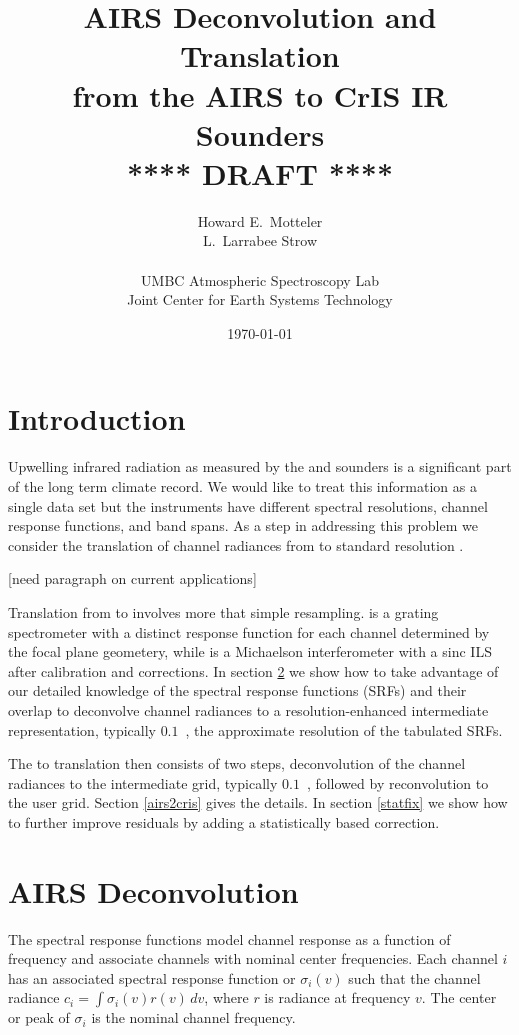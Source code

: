 \documentclass[12pt]{article}
\title{AIRS Deconvolution and Translation \\
  from the AIRS to CrIS IR Sounders \\
  \vspace{3mm}
  {****} DRAFT {****}\\
}
\author{Howard E.~Motteler \\
  L.~Larrabee Strow \\
  \\
  UMBC Atmospheric Spectroscopy Lab \\
  Joint Center for Earth Systems Technology \\
}
\date{\today}
\begin{document}
\maketitle

\section{Introduction}

Upwelling infrared radiation as measured by the {\airs} \cite{airs1}
and {\cris} \cite{cris1,cris2} sounders is a significant part of the
long term climate record.  We would like to treat this information as
a single data set but the instruments have different spectral
resolutions, channel response functions, and band spans.  As a step
in addressing this problem we consider the translation of channel
radiances from {\airs} to standard resolution {\cris}.

[need paragraph on current applications]

Translation from {\airs} to {\cris} involves more that simple
resampling.  {\airs} is a grating spectrometer with a distinct
response function for each channel determined by the focal plane
geometery, while {\cris} is a Michaelson interferometer with a sinc
ILS after calibration and corrections.  In section \ref{decon} we
show how to take advantage of our detailed knowledge of the {\airs}
spectral response functions (SRFs) and their overlap to deconvolve
channel radiances to a resolution-enhanced intermediate
representation, typically $0.1$~\wn, the approximate resolution of
the tabulated {\airs} SRFs.

The {\airs} to {\cris} translation then consists of two steps,
deconvolution of the {\airs} channel radiances to the intermediate
grid, typically $0.1$~\wn, followed by reconvolution to the {\cris}
user grid.  Section \ref{airs2cris} gives the details.  In section
\ref{statfix} we show how to further improve residuals by adding a
statistically based correction.

\FloatBarrier
\section{AIRS Deconvolution}
\label{decon}

The {\airs} spectral response functions model channel response as a
function of frequency and associate channels with nominal center
frequencies.  Each {\airs} channel $i$ has an associated spectral
response function or {\srf} $\sigma_i(v)$ such that the channel
radiance $c_i = \int \sigma_i(v)r(v)\,dv$, where $r$ is radiance at
frequency $v$.  The center or peak of $\sigma_i$ is the nominal
channel frequency.
\end{document}
